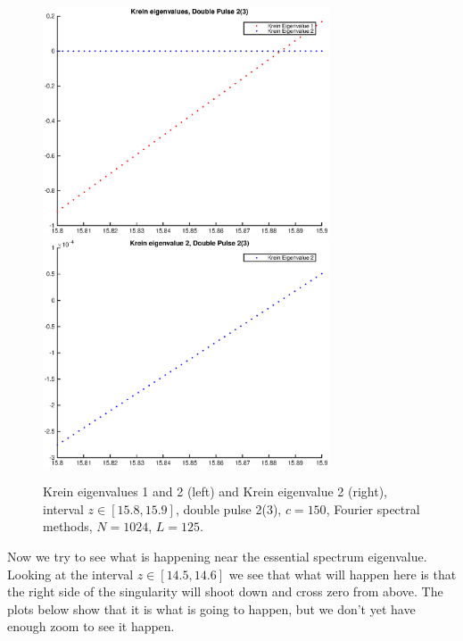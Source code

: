 \documentclass[12pt]{article}
\begin{document}
\begin{figure}[H]
	\includegraphics[width=8.5cm]{1500F_dp2_125_kreinzoom1.eps}
	\includegraphics[width=8.5cm]{1500F_dp2_125_kreinzoom2.eps}
	\caption{Krein eigenvalues 1 and 2 (left) and Krein eigenvalue 2 (right), interval $z \in [15.8, 15.9]$, double pulse 2(3), $c = 150$, Fourier spectral methods, $N = 1024$, $L = 125$. }
\end{figure}

Now we try to see what is happening near the essential spectrum eigenvalue. Looking at the interval $z \in [14.5, 14.6]$ we see that what will happen here is that the right side of the singularity will shoot down and cross zero from above. The plots below show that it is what is going to happen, but we don't yet have enough zoom to see it happen.
\end{document}
